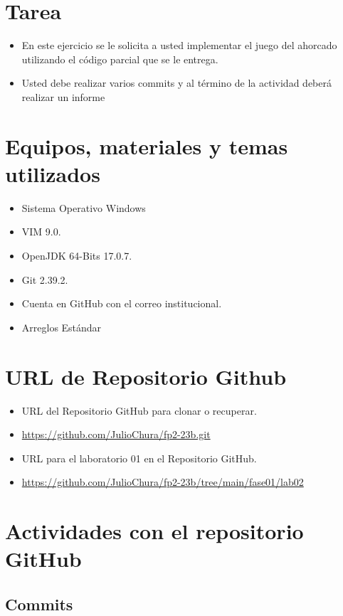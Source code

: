 \documentclass{article}
\begin{document}
	\section{Tarea}
	\begin{itemize}		
		\item 
		En este ejercicio se le solicita a usted implementar el juego del ahorcado utilizando el código parcial que 
		se le entrega.
		\item Usted debe realizar varios commits y al término de la actividad deberá realizar un informe
		
	\end{itemize}
	
	\section{Equipos, materiales y temas utilizados}
	\begin{itemize}
		\item Sistema Operativo Windows
		\item VIM 9.0.
		\item OpenJDK 64-Bits 17.0.7.
		\item Git 2.39.2.
		\item Cuenta en GitHub con el correo institucional.
		\item Arreglos Estándar
	\end{itemize}
	
	\section{URL de Repositorio Github}
	\begin{itemize}
		\item URL del Repositorio GitHub para clonar o recuperar.
		\item \url{https://github.com/JulioChura/fp2-23b.git}
		\item URL para el laboratorio 01 en el Repositorio GitHub.
		\item \url{https://github.com/JulioChura/fp2-23b/tree/main/fase01/lab02}
	\end{itemize}
	
	\section{Actividades con el repositorio GitHub}
	
	\subsection{Commits}
	
\end{document}

